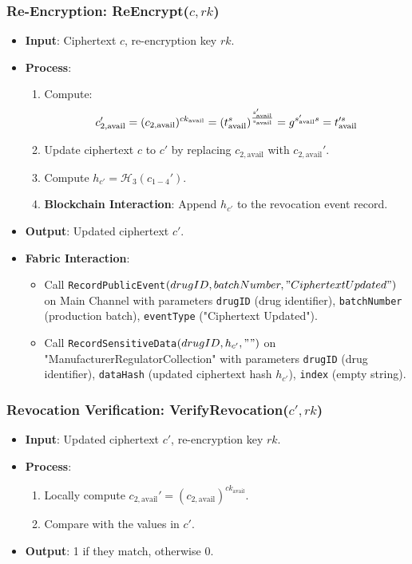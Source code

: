 \documentclass[runningheads]{llncs}
\begin{document}
\subsubsection{Re-Encryption: ReEncrypt($c, rk$)}
\begin{itemize}
    \item \textbf{Input}: Ciphertext $c$, re-encryption key $rk$.
    \item \textbf{Process}:
    \begin{enumerate}
        \item Compute:
        $$
        c_{2,\text{avail}}' = (c_{2,\text{avail}})^{ck_{\text{avail}}} \\
        =  (t_{\text{avail}}^s)^{\frac{s_{\text{avail}}'}{s_{\text{avail}}}} = g^{s_{\text{avail}}' s} = t_{\text{avail}}'^s
        $$
        \item Update ciphertext $c$ to $c'$ by replacing $c_{2,\text{avail}}$ with $c_{2,\text{avail}}'$.
        \item Compute $h_{c'} = \mathcal{H}_3(c_{1-4}')$.
        \item \textbf{Blockchain Interaction}: Append $h_{c'}$ to the revocation event record.
    \end{enumerate}
    \item \textbf{Output}: Updated ciphertext $c'$.
    \item \textbf{Fabric Interaction}:
    \begin{itemize}
        \item Call \texttt{RecordPublicEvent$(drugID, batchNumber,\\ "Ciphertext Updated")$} on Main Channel with parameters \texttt{drugID} (drug identifier), \texttt{batchNumber} (production batch), \texttt{eventType} ("Ciphertext Updated").
        \item Call \texttt{RecordSensitiveData$(drugID, h_{c'}, "")$} on "ManufacturerRegulatorCollection" with parameters \texttt{drugID} (drug identifier), \texttt{dataHash} (updated ciphertext hash $h_{c'}$), \texttt{index} (empty string).
    \end{itemize}
\end{itemize}

\subsubsection{Revocation Verification: VerifyRevocation($c', rk$)}
\begin{itemize}
    \item \textbf{Input}: Updated ciphertext $c'$, re-encryption key $rk$.
    \item \textbf{Process}:
    \begin{enumerate}
        \item Locally compute $c_{2,\text{avail}}' = (c_{2,\text{avail}})^{ck_{\text{avail}}}$.
        \item Compare with the values in $c'$.
    \end{enumerate}
    \item \textbf{Output}: 1 if they match, otherwise 0.
\end{itemize}
\end{document}
